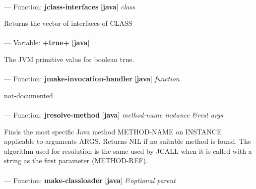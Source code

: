 \paragraph{}
\label{JAVA:JCLASS-INTERFACES}
--- Function: \textbf{jclass-interfaces} [\textbf{java}] \textit{class}

\begin{adjustwidth}{5em}{5em}
Returns the vector of interfaces of CLASS
\end{adjustwidth}

\paragraph{}
\label{JAVA:+TRUE+}
--- Variable: \textbf{+true+} [\textbf{java}] \textit{}

\begin{adjustwidth}{5em}{5em}
The JVM primitive value for boolean true.
\end{adjustwidth}

\paragraph{}
\label{JAVA:JMAKE-INVOCATION-HANDLER}
--- Function: \textbf{jmake-invocation-handler} [\textbf{java}] \textit{function}

\begin{adjustwidth}{5em}{5em}
not-documented
\end{adjustwidth}

\paragraph{}
\label{JAVA:JRESOLVE-METHOD}
--- Function: \textbf{jresolve-method} [\textbf{java}] \textit{method-name instance \&rest args}

\begin{adjustwidth}{5em}{5em}
Finds the most specific Java method METHOD-NAME on INSTANCE applicable to arguments ARGS. Returns NIL if no suitable method is found. The algorithm used for resolution is the same used by JCALL when it is called with a string as the first parameter (METHOD-REF).
\end{adjustwidth}

\paragraph{}
\label{JAVA:MAKE-CLASSLOADER}
--- Function: \textbf{make-classloader} [\textbf{java}] \textit{\&optional parent}

